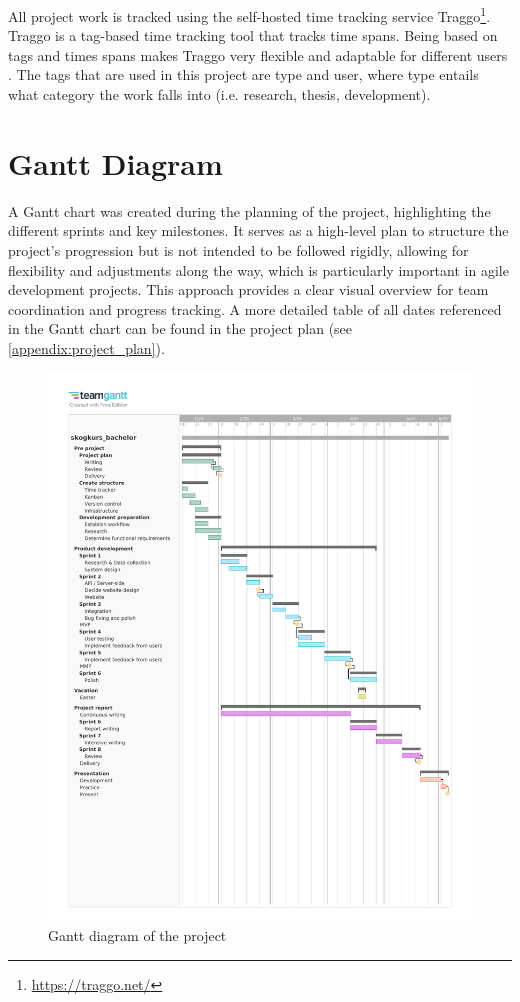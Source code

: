 All project work is tracked using the self-hosted time tracking service Traggo\footnote{\url{https://traggo.net/}}. Traggo is a tag-based time tracking tool that tracks time spans. Being based on tags and times spans makes Traggo very flexible and adaptable for different users \cite{traggonet}. The tags that are used in this project are type and user, where type entails what category the work falls into (i.e. research, thesis, development).

\section{Gantt Diagram}

A Gantt chart was created during the planning of the project, highlighting the different sprints and key milestones. It serves as a high-level plan to structure the project's progression but is not intended to be followed rigidly, allowing for flexibility and adjustments along the way, which is particularly important in agile development projects. This approach provides a clear visual overview for team coordination and progress tracking. A more detailed table of all dates referenced in the Gantt chart can be found in the project plan (see \autoref{appendix:project_plan}).

\begin{figure}[h]
    \centering
        \includegraphics[width=1.0\linewidth, trim=0 60mm 0 20mm, clip]{figures/skogkurs_bachelor_gantt.pdf}
    \caption{Gantt diagram of the project}
    \label{fig:gantt_diagram}
\end{figure}

